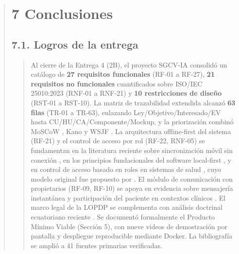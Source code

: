 \documentclass[
]{article}
\begin{document}
\begin{quote}
\section{7 Conclusiones}\label{conclusiones}

\subsection{7.1. Logros de la entrega}\label{s7-1-logros-de-la-entrega}
\begin{quote}
Al cierre de la Entrega 4 (2B), el proyecto SGCV-IA consolidó un
catálogo de \textbf{27 requisitos funcionales} (RF-01 a RF-27),
\textbf{21 requisitos no funcionales} cuantificados sobre ISO/IEC
25010:2023 (RNF-01 a RNF-21) y \textbf{10 restricciones de diseño}
(RST-01 a RST-10). La matriz de trazabilidad extendida alcanzó
\textbf{63 filas} (TR-01 a TR-63), enlazando Ley/Objetivo/Interesado/EV
hasta CU/HU/CA/Componente/Mockup, y la priorización combinó MoSCoW
\cite{vijayakumar2024}, Kano \cite{binder2023} y WSJF
\cite{reinertsen2009,leffingwell2016}. La arquitectura offline-first
del sistema (RF-21) y el control de acceso por rol (RF-22, RNF-05) se
fundamentan en la literatura reciente sobre sincronización móvil sin
conexión \cite{ningrum2026}, en los principios fundacionales del
software local-first \cite{kleppmann2019}, y en control de acceso
basado en roles en sistemas de salud \cite{carvalho2018}, cuyo modelo
original fue propuesto por \cite{ferraiolo1992}. El módulo de comunicación con
propietarios (RF-09, RF-10) se apoya en evidencia sobre mensajería
instantánea y participación del paciente en contextos clínicos
\cite{manurung2026,blasiak2022}. El marco legal de la LOPDP se
complementa con análisis doctrinal ecuatoriano reciente
\cite{rovira2023,zambrano2023}. Se documentó formalmente el
Producto Mínimo Viable (Sección 5), con nueve videos de demostración
por pantalla y despliegue reproducible mediante Docker. La bibliografía
se amplió a 41 fuentes primarias verificadas.
\end{quote}

\end{quote}
\end{document}
